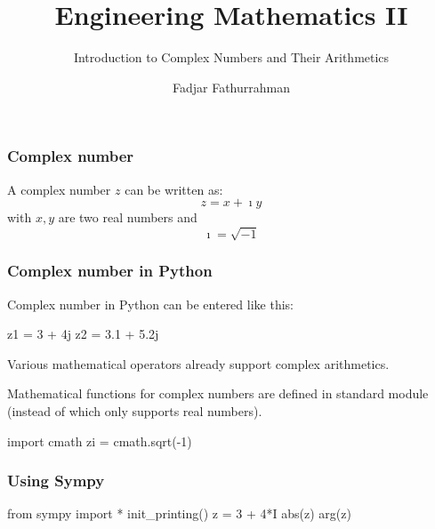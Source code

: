



\title{Engineering Mathematics II}
\subtitle{Introduction to Complex Numbers and Their Arithmetics}
\author{Fadjar Fathurrahman} %
\date{}

\frame{\titlepage}

\begin{frame}
\frametitle{Complex number}

A complex number $z$ can be written as:
$$
z = x + \imath y
$$
with $x,y$ are two real numbers and
$$
\imath = \sqrt{-1}
$$

\end{frame}




\begin{frame}[fragile]
\frametitle{Complex number in Python}

Complex number in Python can be entered like this:
\begin{pythoncode}
z1 = 3 + 4j
z2 = 3.1 + 5.2j
\end{pythoncode}
Various mathematical operators already support complex arithmetics.

Mathematical functions for complex numbers are defined in standard module
 (instead of  which only supports real numbers).
\begin{pythoncode}
import cmath
zi = cmath.sqrt(-1)
\end{pythoncode}

\end{frame}


\begin{frame}[fragile]
\frametitle{Using Sympy}
  
\begin{pythoncode}
from sympy import *
init_printing()
z = 3 + 4*I
abs(z)
arg(z)
\end{pythoncode}

\end{frame}




